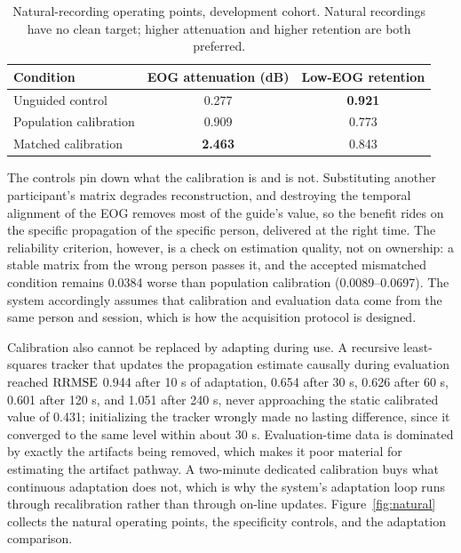 \begin{table}[t]
\caption{Natural-recording operating points, development cohort. Natural recordings have no clean target; higher attenuation and higher retention are both preferred.}
\label{tab:natural}
\centering
\small
\begin{tabular}{@{}lcc@{}}
\toprule
Condition & EOG attenuation (dB) & Low-EOG retention \\
\midrule
Unguided control & 0.277 & \textbf{0.921} \\
Population calibration & 0.909 & 0.773 \\
Matched calibration & \textbf{2.463} & 0.843 \\
\bottomrule
\end{tabular}
\end{table}

The controls pin down what the calibration is and is not. Substituting another participant's matrix degrades reconstruction, and destroying the temporal alignment of the EOG removes most of the guide's value, so the benefit rides on the specific propagation of the specific person, delivered at the right time. The reliability criterion, however, is a check on estimation quality, not on ownership: a stable matrix from the wrong person passes it, and the accepted mismatched condition remains 0.0384 worse than population calibration (0.0089--0.0697). The system accordingly assumes that calibration and evaluation data come from the same person and session, which is how the acquisition protocol is designed.

Calibration also cannot be replaced by adapting during use. A recursive least-squares tracker that updates the propagation estimate causally during evaluation reached $\mathrm{RRMSE}$ 0.944 after 10 s of adaptation, 0.654 after 30 s, 0.626 after 60 s, 0.601 after 120 s, and 1.051 after 240 s, never approaching the static calibrated value of 0.431; initializing the tracker wrongly made no lasting difference, since it converged to the same level within about 30 s. Evaluation-time data is dominated by exactly the artifacts being removed, which makes it poor material for estimating the artifact pathway. A two-minute dedicated calibration buys what continuous adaptation does not, which is why the system's adaptation loop runs through recalibration rather than through on-line updates. Figure~\ref{fig:natural} collects the natural operating points, the specificity controls, and the adaptation comparison.

